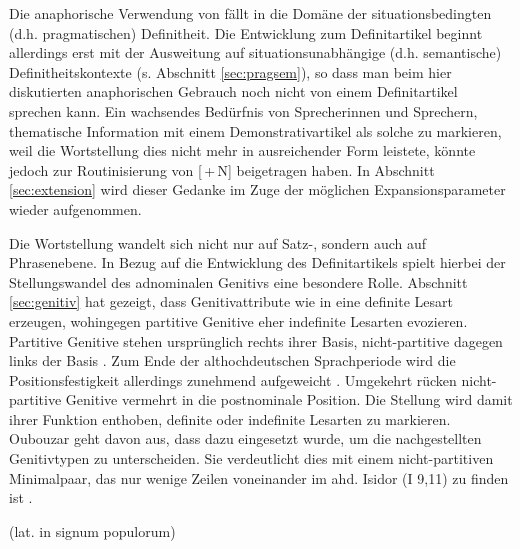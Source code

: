 \noindent
Die anaphorische Verwendung von  fällt in die Domäne der situationsbedingten (d.h. pragmatischen) Definitheit. Die Entwicklung zum Definitartikel beginnt allerdings erst mit der Ausweitung auf situationsunabhängige (d.h. semantische) Definitheitskontexte (s. Abschnitt \ref{sec:pragsem}), so dass man beim hier diskutierten anaphorischen Gebrauch noch nicht von einem Definitartikel sprechen kann. Ein wachsendes Bedürfnis von Sprecherinnen und Sprechern, thematische Information mit einem Demonstrativartikel als solche zu markieren, weil die Wortstellung dies nicht mehr in ausreichender Form leistete, könnte jedoch zur Routinisierung von [\,+\,N] beigetragen haben. In Abschnitt \ref{sec:extension} wird dieser Gedanke im Zuge der möglichen Expan\-sions\-parameter wieder aufgenommen. 

Die Wortstellung wandelt sich nicht nur auf Satz-, sondern auch auf Phrasenebene. In Bezug auf die Entwicklung des Definitartikels spielt hierbei der Stellungswandel des adnominalen Genitivs eine besondere Rolle. Abschnitt \ref{sec:genitiv} hat gezeigt, dass Genitivattribute wie in  eine definite Lesart erzeugen, wohingegen partitive Genitive eher indefinite Lesarten evozieren. Partitive Genitive stehen ursprünglich rechts ihrer Basis, nicht-partitive dagegen links der Basis \parencite[177]{Behaghel1932}. Zum Ende der althochdeutschen Sprachperiode wird die Positionsfestigkeit allerdings zunehmend aufgeweicht \parencite[235]{Oubouzar1997}. Umgekehrt rücken nicht-partitive Genitive vermehrt in die postnominale Position. Die Stellung wird damit ihrer Funktion enthoben, definite oder indefinite Lesarten zu markieren. Oubouzar geht davon aus, dass  dazu eingesetzt wurde, um die nachgestellten Genitivtypen zu unterscheiden.  Sie verdeutlicht dies mit einem nicht-partitiven Minimalpaar, das nur wenige Zeilen voneinander im ahd. Isidor (I 9,11) zu finden ist \parencite[vgl.][79]{Oubouzar1992}.  
 

\begin{exe}
	\ex \label{ex:genitiv-stellung}  (lat. in signum populorum)
	\begin{xlist} 
		\ex \label{ex:gen-prae}   
		\ex \label{ex:gen-post}  		
		\end{xlist}
\end{exe}

